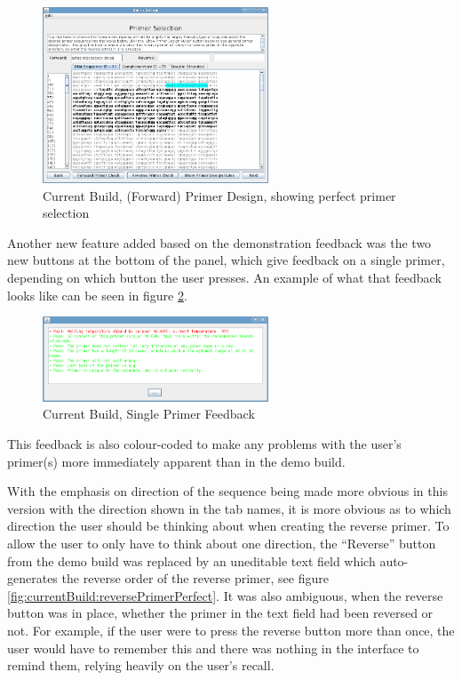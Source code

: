 \begin{figure}[!t]
  \begin{center}
    \includegraphics[width=0.6\textwidth]{./images/currentBuild/forwardPerfectPrimer.png}
    \caption{
      \label{fig:currentBuild:forwardPerfectPrimer}
      Current Build, (Forward) Primer Design, showing perfect primer selection
    }
  \end{center}
\end{figure}

Another new feature added based on the demonstration feedback was the
two new buttons at the bottom of the panel, which give feedback on a
single primer, depending on which button the user presses.
An example of what that feedback looks like can be seen in figure
\ref{fig:currentBuild:primerEvalRed}.

\begin{figure}[!t]
  \begin{center}
    \includegraphics[width=0.6\textwidth]{./images/currentBuild/primerEvalRed.png}
    \caption{
      \label{fig:currentBuild:primerEvalRed}
      Current Build, Single Primer Feedback
    }
  \end{center}
\end{figure}

This feedback is also colour-coded to make any problems with the
user's primer(s) more immediately apparent than in the demo build.

With the emphasis on direction of the sequence being made more obvious
in this version with the direction shown in the tab names, it is more
obvious as to which direction the user should be thinking about when
creating the reverse primer.
To allow the user to only have to think about one direction, the
``Reverse'' button from the demo build was replaced by an uneditable
text field which auto-generates the reverse order of the reverse
primer, see figure \ref{fig:currentBuild:reversePrimerPerfect}.
It was also ambiguous, when the reverse button was in place, whether
the primer in the text field had been reversed or not. 
For example, if the user were to press the reverse button more than
once, the user would have to remember this and there was nothing in
the interface to remind them, relying heavily on the user's recall.

